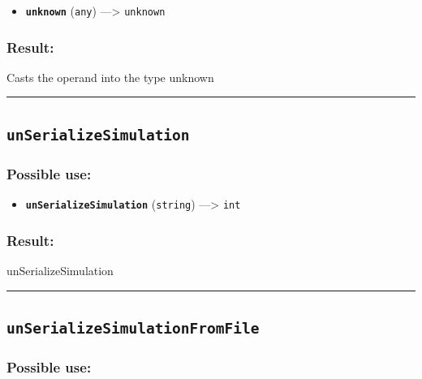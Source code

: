 \documentclass[]{book}
\providecommand{\tightlist}{%
  \setlength{\itemsep}{0pt}\setlength{\parskip}{0pt}}
\theoremstyle{definition}
\theoremstyle{definition}
\theoremstyle{definition}
\theoremstyle{remark}
\begin{document}
\begin{itemize}
\tightlist
\item
  \textbf{\texttt{unknown}} (\texttt{any}) ---\textgreater{}
  \texttt{unknown}
\end{itemize}

\subsubsection{Result:}\label{result-520}

Casts the operand into the type unknown

\begin{center}\rule{0.5\linewidth}{\linethickness}\end{center}

\subsection{\texorpdfstring{\texttt{unSerializeSimulation}}{unSerializeSimulation}}\label{unserializesimulation}

\subsubsection{Possible use:}\label{possible-use-540}

\begin{itemize}
\tightlist
\item
  \textbf{\texttt{unSerializeSimulation}} (\texttt{string})
  ---\textgreater{} \texttt{int}
\end{itemize}

\subsubsection{Result:}\label{result-521}

unSerializeSimulation

\begin{center}\rule{0.5\linewidth}{\linethickness}\end{center}

\subsection{\texorpdfstring{\texttt{unSerializeSimulationFromFile}}{unSerializeSimulationFromFile}}\label{unserializesimulationfromfile}

\subsubsection{Possible use:}\label{possible-use-541}
\end{document}
